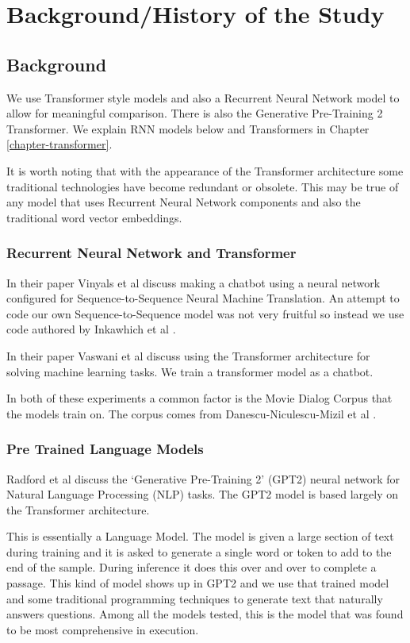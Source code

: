 \chapter{Background/History of the Study}
\section{Background}
We use Transformer style models and also a Recurrent Neural Network model to allow for meaningful comparison. There is also the Generative Pre-Training 2 Transformer. We explain \ac{RNN} models below and Transformers in Chapter \ref{chapter-transformer}.

It is worth noting that with the appearance of the Transformer architecture some traditional technologies have become redundant or obsolete. This may be true of any model that uses Recurrent Neural Network components and also the traditional word vector embeddings.

\subsection{Recurrent Neural Network and Transformer}

In their paper Vinyals et al \cite{DBLP:journals/corr/VinyalsL15} discuss making a chatbot using a neural network configured for Sequence-to-Sequence Neural Machine Translation. An attempt to code our own Sequence-to-Sequence model was not very fruitful so instead we use code authored by Inkawhich et al \cite{2018Inkawhich}.

In their paper Vaswani et al \cite{Vaswani2017AttentionIA} discuss using the Transformer architecture for solving machine learning tasks. We train a transformer model as a chatbot.

In both of these experiments a common factor is the Movie Dialog Corpus that the models train on. The corpus comes from Danescu-Niculescu-Mizil et al \cite{Danescu-Niculescu-Mizil+Lee:11a}.

\subsection{Pre Trained Language Models}
Radford et al \cite{radford2019language} discuss the `Generative Pre-Training 2' (GPT2) neural network for Natural Language Processing (\ac{NLP}) tasks. The GPT2 model is based largely on the Transformer architecture. 

This is essentially a Language Model. The model is given a large section of text during training and it is asked to generate a single word or token to add to the end of the sample. During inference it does this over and over to complete a passage. This kind of model shows up in GPT2 and we use that trained model and some traditional programming techniques to generate text that naturally answers questions. Among all the models tested, this is the model that was found to be most comprehensive in execution.

